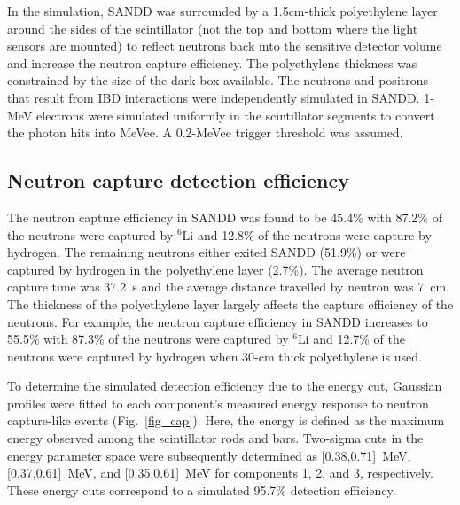 \documentclass[final,5p,times,twocolumn]{elsarticle}
\begin{document}
In the simulation, SANDD was surrounded by a 1.5cm-thick polyethylene layer around the sides of the scintillator (not the top and bottom where the light sensors are mounted) to reflect neutrons back into the sensitive detector volume and increase the neutron capture efficiency. The polyethylene thickness was constrained by the size of the dark box available. The neutrons and positrons that result from IBD interactions were independently simulated in SANDD. 1-MeV electrons were simulated uniformly in the scintillator segments to convert the photon hits into MeVee. A 0.2-MeVee trigger threshold was assumed. 

\subsection{Neutron capture detection efficiency}

The neutron capture efficiency in SANDD was found to be 45.4\% with 87.2\% of the neutrons were captured by $^6$Li and 12.8\% of the neutrons were capture by hydrogen. The remaining neutrons either exited SANDD (51.9\%) or were captured by hydrogen in the polyethylene layer (2.7\%). The average neutron capture time was 37.2~{\textmu}s and the average distance travelled by neutron was 7~cm. The thickness of the polyethylene layer largely affects the capture efficiency of the neutrons. For example, the neutron capture efficiency in SANDD increases to 55.5\% with 87.3\% of the neutrons were captured by $^6$Li and 12.7\% of the neutrons were captured by hydrogen when 30-cm thick polyethylene is used.

To determine the simulated detection efficiency due to the energy cut, Gaussian profiles were fitted to each component's measured energy response to neutron capture-like events (Fig.~\ref{fig_cap}). Here, the energy is defined as the maximum energy observed among the scintillator rods and bars. Two-sigma cuts in the energy parameter space were subsequently determined as [0.38,0.71]~MeV, [0.37,0.61]~MeV, and [0.35,0.61]~MeV for components 1, 2, and 3, respectively. These energy cuts correspond to a simulated 95.7\% detection efficiency.


\end{document}
